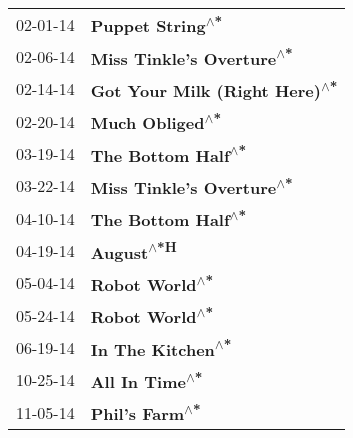\begin{supertabular}{p{0.25\columnwidth}p{0.75\columnwidth}}
 02-01-14 &               \textbf{Puppet String\textsuperscript{$\wedge$*}} \\
 02-06-14 &      \textbf{Miss Tinkle's Overture\textsuperscript{$\wedge$*}} \\
 02-14-14 &  \textbf{Got Your Milk (Right Here)\textsuperscript{$\wedge$*}} \\
 02-20-14 &                \textbf{Much Obliged\textsuperscript{$\wedge$*}} \\
 03-19-14 &             \textbf{The Bottom Half\textsuperscript{$\wedge$*}} \\
 03-22-14 &      \textbf{Miss Tinkle's Overture\textsuperscript{$\wedge$*}} \\
 04-10-14 &             \textbf{The Bottom Half\textsuperscript{$\wedge$*}} \\
 04-19-14 &                     \textbf{August\textsuperscript{$\wedge$*H}} \\
 05-04-14 &                 \textbf{Robot World\textsuperscript{$\wedge$*}} \\
 05-24-14 &                 \textbf{Robot World\textsuperscript{$\wedge$*}} \\
 06-19-14 &              \textbf{In The Kitchen\textsuperscript{$\wedge$*}} \\
 10-25-14 &                 \textbf{All In Time\textsuperscript{$\wedge$*}} \\
 11-05-14 &                 \textbf{Phil's Farm\textsuperscript{$\wedge$*}} \\
\end{supertabular}
